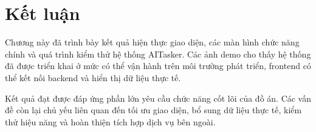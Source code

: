\section{Kết luận}
\label{sec:chapter6-conclusion}

Chương này đã trình bày kết quả hiện thực giao diện, các màn hình chức năng chính và quá trình kiểm thử hệ thống AITasker. Các ảnh demo cho thấy hệ thống đã được triển khai ở mức có thể vận hành trên môi trường phát triển, frontend có thể kết nối backend và hiển thị dữ liệu thực tế.

Kết quả đạt được đáp ứng phần lớn yêu cầu chức năng cốt lõi của đồ án. Các vấn đề còn lại chủ yếu liên quan đến tối ưu giao diện, bổ sung dữ liệu thực tế, kiểm thử hiệu năng và hoàn thiện tích hợp dịch vụ bên ngoài.
